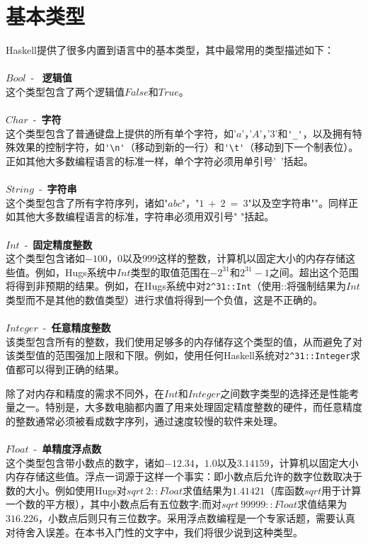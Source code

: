 \section{基本类型}
\noindent Haskell提供了很多内置到语言中的基本类型，其中最常用的类型描述如下：
\\
\\
$Bool$~-~ \textbf{逻辑值}\\
这个类型包含了两个逻辑值$False$和$True$。
\\
\\
$Char$~-~\textbf{字符}\\
这个类型包含了普通键盘上提供的所有单个字符，如'$a$'，'$A$'，'$3$'和\verb|'_'|，以及拥有特殊效果的控制字符，如\verb|'\n'|（移动到新的一行）和\verb|'\t'|（移动到下一个制表位）。正如其他大多数编程语言的标准一样，单个字符必须用单引号'~'括起。
\\
\\
$String$~-~\textbf{字符串}\\
这个类型包含了所有字符序列，诸如"$abc$"，"$1~+~2~=~3$"以及空字符串""。同样正如其他大多数编程语言的标准，字符串必须用双引号" "括起。
\\
\\
$Int$~-~\textbf{固定精度整数}\\
这个类型包含诸如$-100$，$0$以及$999$这样的整数，计算机以固定大小的内存存储这些值。例如，Hugs系统中$Int$类型的取值范围在$-2^{31}$和$2^{31}-1$之间。超出这个范围将得到非预期的结果。例如，在Hugs系统中对\verb|2^31::Int|（使用::将强制结果为$Int$类型而不是其他的数值类型）进行求值将得到一个负值，这是不正确的。
\\
\\
$Integer$~-~\textbf{任意精度整数}\\
该类型包含所有的整数，我们使用足够多的内存储存这个类型的值，从而避免了对该类型值的范围强加上限和下限。例如，使用任何Haskell系统对\verb|2^31::Integer|求值都可以得到正确的结果。

除了对内存和精度的需求不同外，在$Int$和$Integer$之间数字类型的选择还是性能考量之一。特别是，大多数电脑都内置了用来处理固定精度整数的硬件，而任意精度的整数通常必须被看成数字序列，通过速度较慢的软件来处理。
\\
\\
$Float$~-~\textbf{单精度浮点数}\\
这个类型包含带小数点的数字，诸如$-12.34$，$1.0$以及$3.14159$，计算机以固定大小内存存储这些值。浮点一词源于这样一个事实：即小数点后允许的数字位数取决于数的大小。例如使用Hugs对$sqrt
~2 ::
Float$求值结果为$1.41421$（库函数$sqrt$用于计算一个数的平方根），其中小数点后有五位数字;而对$sqrt~99999::Float$求值结果为$316.226$，小数点后则只有三位数字。采用浮点数编程是一个专家话题，需要认真对待舍入误差。在本书入门性的文字中，我们将很少说到这种类型。

